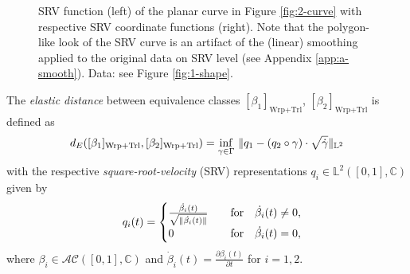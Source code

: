\begin{figure}
  \centering
  \begin{subfigure}{.48\textwidth}
    \centering
  \end{subfigure}\hfill%
  \begin{subfigure}{.48\textwidth}
    \centering
    \begin{subfigure}{\textwidth}
      \centering
    \end{subfigure}
    \begin{subfigure}{\textwidth}
      \centering
    \end{subfigure}
  \end{subfigure}
  \caption{SRV function (left) of the planar curve in Figure \ref{fig:2-curve} with respective SRV coordinate functions (right). Note that the polygon-like look of the SRV curve is an artifact of the (linear) smoothing applied to the original data on SRV level (see Appendix \ref{app:a-smooth}). Data: see Figure \ref{fig:1-shape}.}
  \label{fig:2-srv}
\end{figure}

\begin{definition}
  \label{def:2-eldist}
  The \emph{elastic distance} between equivalence classes $[\beta_1]_{\text{Wrp} + \text{Trl}}$, $[\beta_2]_{\text{Wrp} + \text{Trl}}$ is defined as
  \begin{equation}
    \label{eq:2-eldist-def}
    d_{E}([\beta_1]_\text{Wrp+Trl}, [\beta_2]_\text{Wrp+Trl}) = \inf_{\gamma \in \Gamma} \,\, \lVert q_1 - ( q_2 \circ \gamma) \cdot \sqrt{\dot\gamma}\rVert_{\mathbb{L}^2}
  \end{equation}
  with the respective \emph{square-root-velocity} (SRV) representations $q_i \in \mathbb{L}^2([0,1],\mathbb{C})$ given by 
  \begin{equation}
   \quad q_i(t) = 
    \begin{cases}
      \frac{\dot{\beta_i}(t)}{\sqrt{\lVert\dot{\beta_i}(t)\rVert}} & \quad\text{for}\quad\dot{\beta_i}(t) \neq 0, \\
      0 & \quad\text{for}\quad\dot{\beta_i}(t) = 0,
    \end{cases}
  \end{equation}
  where $\beta_i \in \mathcal{AC}([0,1], \mathbb{C})$ and $\dot\beta_i(t) = \frac{\partial\beta_i(t)}{\partial t}$ for $i=1,2$.
\end{definition}

